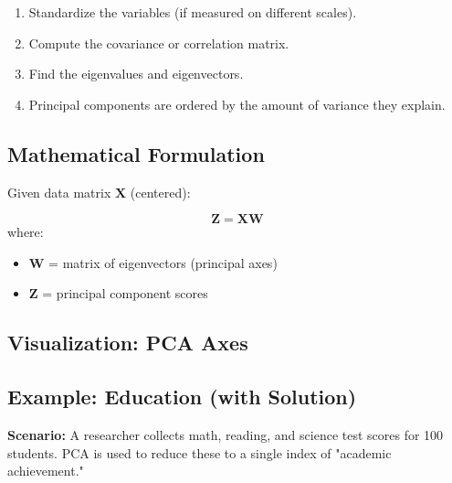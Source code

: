 \documentclass[11pt]{article}
\begin{document}
\begin{enumerate}
    \item Standardize the variables (if measured on different scales).
    \item Compute the covariance or correlation matrix.
    \item Find the eigenvalues and eigenvectors.
    \item Principal components are ordered by the amount of variance they explain.
\end{enumerate}

\subsection{Mathematical Formulation}

Given data matrix $\mathbf{X}$ (centered):

\[
\mathbf{Z} = \mathbf{X} \mathbf{W}
\]
where:
\begin{itemize}
    \item $\mathbf{W}$ = matrix of eigenvectors (principal axes)
    \item $\mathbf{Z}$ = principal component scores
\end{itemize}

\subsection*{Visualization: PCA Axes}
\begin{center}
\end{center}

\subsection{Example: Education (with Solution)}

\textbf{Scenario:} A researcher collects math, reading, and science test scores for 100 students. PCA is used to reduce these to a single index of "academic achievement."
\end{document}
